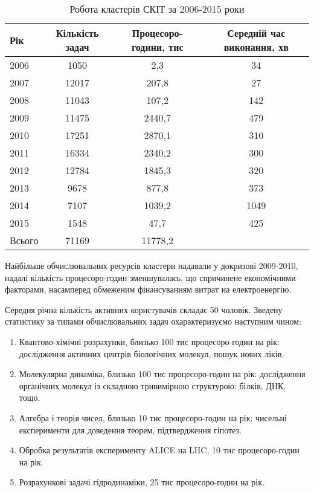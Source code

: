 \begin{table}[htb]
  \begin{center}
    \caption{Робота кластерів СКІТ за 2006-2015 роки}
    \begin{tabular}{|l|c|c|c|}
      \hline
Рік & Кількість задач & Процесоро-години, тис & Середній час виконання, хв \\
      \hline
2006 & 1050 & 2,3 & 34 \\
2007 & 12017 & 207,8 & 27 \\
2008 & 11043 & 107,2 & 142 \\
2009 & 11475 & 2440,7 & 479 \\
2010 & 17251 & 2870,1 & 310 \\
2011 & 16334 & 2340,2 & 300 \\
2012 & 12784 & 1845,3 & 320 \\
2013 & 9678 & 877,8 & 373 \\
2014 & 7107 & 1039,2 & 1049 \\
2015 & 1548 & 47,7 & 425 \\
\hline
Всього & 71169 & 11778,2 & \\
\hline
    \end{tabular}
    \label{tab:usage}
  \end{center}
\end{table}


Найбільше обчислювальних ресурсів кластери надавали у докризові 2009-2010, надалі кількість процесоро-годин зменшувалась, що спричинене економічними факторами, насамперед обмеженим фінансуванням витрат на електроенергію.


Середня річна кількість активних користувачів складає 50 чоловік. Зведену статистику за типами обчислювальних задач охарактеризуємо наступним чином:

\begin{enumerate}
 \item Квантово-хімічні розрахунки, близько 100 тис процесоро-годин на рік: дослідження активних центрів біологічних молекул, пошук нових ліків.
 \item  Молекулярна динаміка, близько 100 тис процесоро-годин на рік: дослідження органічних молекул із складною тривимірною структурою: білків, ДНК, тощо.
 \item  Алгебра і теорія чисел, близько 10 тис процесоро-годин на рік: чисельні експерименти для доведення теорем, підтвердження гіпотез.
 \item  Обробка результатів експерименту ALICE на LHC, 10 тис процесоро-годин  на рік.
 \item  Розрахункові задачі гідродинаміки, 25 тис процесоро-годин на рік.
\end{enumerate}


